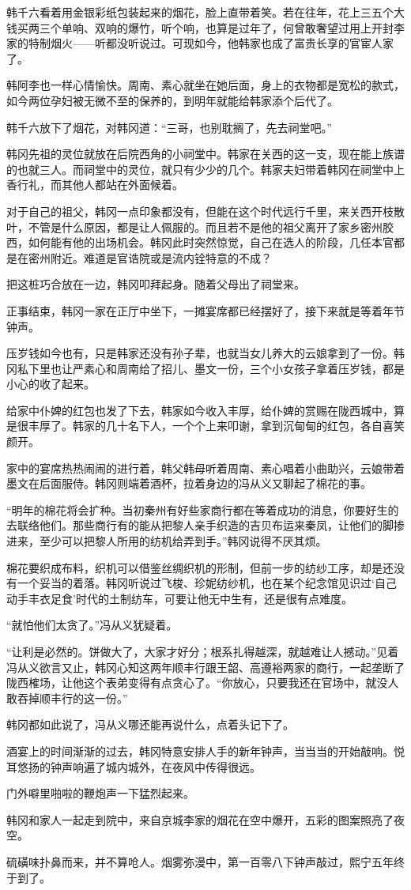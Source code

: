 韩千六看着用金银彩纸包装起来的烟花，脸上直带着笑。若在往年，花上三五个大钱买两三个单响、双响的爆竹，听个响，也算是过年了，何曾敢奢望过用上开封李家的特制烟火——听都没听说过。可现如今，他韩家也成了富贵长享的官宦人家了。

韩阿李也一样心情愉快。周南、素心就坐在她后面，身上的衣物都是宽松的款式，如今两位孕妇被无微不至的保养的，到明年就能给韩家添个后代了。

韩千六放下了烟花，对韩冈道：“三哥，也别耽搁了，先去祠堂吧。”

韩冈先祖的灵位就放在后院西角的小祠堂中。韩家在关西的这一支，现在能上族谱的也就三人。而祠堂中的灵位，就只有少少的几个。韩家夫妇带着韩冈在祠堂中上香行礼，而其他人都站在外面候着。

对于自己的祖父，韩冈一点印象都没有，但能在这个时代远行千里，来关西开枝散叶，不管是什么原因，都是让人佩服的。而且若不是他的祖父离开了家乡密州胶西，如何能有他的出场机会。韩冈此时突然惊觉，自己在选人的阶段，几任本官都是在密州附近。难道是官诰院或是流内铨特意的不成？

把这桩巧合放在一边，韩冈叩拜起身。随着父母出了祠堂来。

正事结束，韩冈一家在正厅中坐下，一摊宴席都已经摆好了，接下来就是等着年节钟声。

压岁钱如今也有，只是韩家还没有孙子辈，也就当女儿养大的云娘拿到了一份。韩冈私下里也让严素心和周南给了招儿、墨文一份，三个小女孩子拿着压岁钱，都是小心的收了起来。

给家中仆婢的红包也发了下去，韩家如今收入丰厚，给仆婢的赏赐在陇西城中，算是很丰厚了。韩家的几十名下人，一个个上来叩谢，拿到沉甸甸的红包，各自喜笑颜开。

家中的宴席热热闹闹的进行着，韩父韩母听着周南、素心唱着小曲助兴，云娘带着墨文在后面服侍。韩冈则端着酒杯，拉着身边的冯从义又聊起了棉花的事。

“明年的棉花将会扩种。当初秦州有好些家商行都在等着成功的消息，你要好生的去联络他们。那些商行有的能从把黎人亲手织造的吉贝布运来秦凤，让他们的脚掺进来，至少可以把黎人所用的纺机给弄到手。”韩冈说得不厌其烦。

棉花要织成布料，织机可以借鉴丝绸织机的形制，但前一步的纺纱工序，却是还没有一个妥当的着落。韩冈听说过飞梭、珍妮纺纱机，也在某个纪念馆见识过‘自己动手丰衣足食’时代的土制纺车，可要让他无中生有，还是很有点难度。

“就怕他们太贪了。”冯从义犹疑着。

“让利是必然的。饼做大了，大家才好分；根系扎得越深，就越难让人撼动。”见着冯从义欲言又止，韩冈心知这两年顺丰行跟王韶、高遵裕两家的商行，一起垄断了陇西榷场，让他这个表弟变得有点贪心了。“你放心，只要我还在官场中，就没人敢吞掉顺丰行的这一份。”

韩冈都如此说了，冯从义哪还能再说什么，点着头记下了。

酒宴上的时间渐渐的过去，韩冈特意安排人手的新年钟声，当当当的开始敲响。悦耳悠扬的钟声响遍了城内城外，在夜风中传得很远。

门外噼里啪啦的鞭炮声一下猛烈起来。

韩冈和家人一起走到院中，来自京城李家的烟花在空中爆开，五彩的图案照亮了夜空。

硫磺味扑鼻而来，并不算呛人。烟雾弥漫中，第一百零八下钟声敲过，熙宁五年终于到了。

